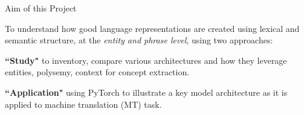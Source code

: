 \begin{frame}{Aim of this Project}

To understand how good language representations are created using lexical and semantic structure, at the \emph{entity and phrase level}, using two approaches:
    
\vspace{15pt}

\begin{itemizeSpaced}{15pt}
    \item \textbf{``Study"} to inventory, compare various architectures and how they leverage entities, polysemy, context for concept extraction. 
    
    \item \textbf{``Application"} using PyTorch to illustrate a key model architecture as it is applied to machine translation (MT) task. 
\end{itemizeSpaced}
    
\end{frame}
